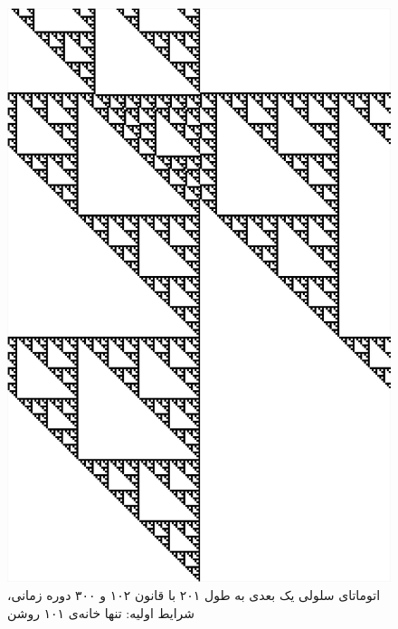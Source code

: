 \documentclass[11pt, a4paper]{article}
\begin{document}
\begin{figure}[!tbp]
\begin{minipage}[b]{0.3\textwidth}
	\includegraphics[width=\textwidth]{q3-102}
    \caption{اتوماتای سلولی یک بعدی به طول ۲۰۱ با قانون ۱۰۲ و ۳۰۰ دوره زمانی، شرایط اولیه: تنها خانه‌ی ۱۰۱ روشن}
	\label{fig:q3-102}
  \end{minipage}
  \hfill
\end{figure}
\end{document}
